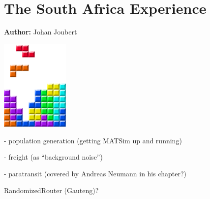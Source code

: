 \chapter{The South Africa Experience }

\hfill \textbf{Author:} Johan Joubert

\begin{center} \includegraphics[width=0.25\textwidth, angle=0]{figures/MATSimBook.png} \end{center}


- population generation (getting MATSim up and running)

- freight (as ``background noise'')

- paratransit (covered by Andreas Neumann in his chapter?)


RandomizedRouter (Gauteng)?



